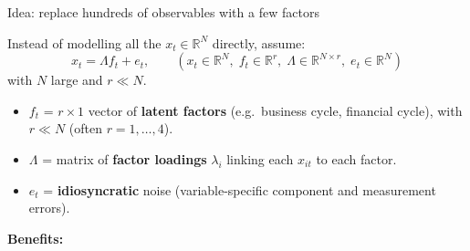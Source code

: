 \documentclass{beamer}
\begin{document}
\begin{frame}{Idea: replace hundreds of observables with a few factors}
\small

Instead of modelling all the $x_t \in \mathbb{R}^N$ directly, assume:
\[
x_t = \Lambda f_t + e_t,
\qquad
(x_t \in \mathbb{R}^N,\;
f_t \in \mathbb{R}^r,\;
\Lambda \in \mathbb{R}^{N \times r},\;
e_t \in \mathbb{R}^N)
\]
with $N$ large and $r \ll N$.

\medskip

\begin{itemize}
  \item $f_t$ = $r\times 1$ vector of \textbf{latent factors} (e.g.\ business cycle, financial cycle), with $r \ll N$ (often $r = 1,\dots,4$).
  \item $\Lambda$ = matrix of \textbf{factor loadings} $\lambda_i$ linking each $x_{it}$ to each factor.
  \item $e_t$ = \textbf{idiosyncratic} noise (variable-specific component and measurement errors).
\end{itemize}

\pause
\textbf{Benefits:}

\end{frame}
\end{document}
